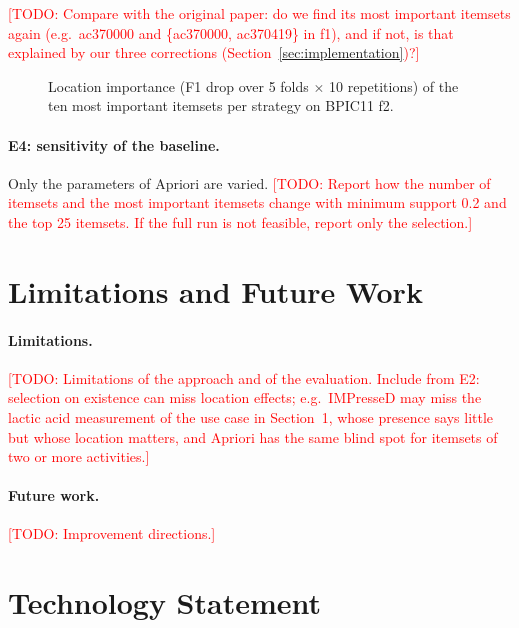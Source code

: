 \documentclass{article}
\newcommand{\todo}[1]{\textcolor{red}{[TODO: #1]}}
\begin{document}
\todo{Compare with the original paper: do we find its most important itemsets again (e.g.\ ac370000 and \{ac370000, ac370419\} in f1), and if not, is that explained by our three corrections (Section~\ref{sec:implementation})?}

\begin{figure}[H]
    \centering
    \caption{Location importance (F1 drop over 5 folds $\times$ 10 repetitions) of the ten most important itemsets per strategy on BPIC11 f2.}
    \label{fig:importance}
\end{figure}

\paragraph{E4: sensitivity of the baseline.} Only the parameters of Apriori are varied. \todo{Report how the number of itemsets and the most important itemsets change with minimum support 0.2 and the top 25 itemsets. If the full run is not feasible, report only the selection.}

\section{Limitations and Future Work}
\label{sec:limitations}

\paragraph{Limitations.}
\todo{Limitations of the approach and of the evaluation. Include from E2: selection on existence can miss location effects; e.g.\ IMPresseD may miss the lactic acid measurement of the use case in Section~1, whose presence says little but whose location matters, and Apriori has the same blind spot for itemsets of two or more activities.}

\paragraph{Future work.}
\todo{Improvement directions.}

\section*{Technology Statement}
\end{document}
